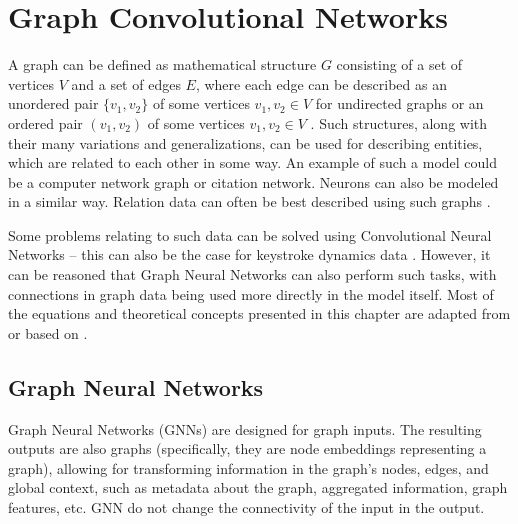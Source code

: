 
\chapter{Graph Convolutional Networks}

A graph can be defined as mathematical structure $G$ consisting of a set of vertices $V$ and a set of edges $E$, where each edge can be described as an unordered pair $\{ v_1, v_2 \}$ of some vertices $v_1, v_2 \in V$ for undirected graphs or an ordered pair $( v_1, v_2 )$ of some vertices $v_1, v_2 \in V$ \cite{wikipedia_graph_2025}. Such structures, along with their many variations and generalizations, can be used for describing entities, which are related to each other in some way. An example of such a model could be a computer network graph or citation network. Neurons can also be modeled in a similar way. Relation data can often be best described using such graphs \cite{Lesk2024}.

Some problems relating to such data can be solved using Convolutional Neural Networks -- this can also be the case for keystroke dynamics data \cite{Lu2020}\cite{Shar2023}. However, it can be reasoned that Graph Neural Networks can also perform such tasks, with connections in graph data being used more directly in the model itself. Most of the equations and theoretical concepts presented in this chapter are adapted from or based on \cite{Lesk2024}.

\section{Graph Neural Networks}
Graph Neural Networks (GNNs) are designed for graph inputs. The resulting outputs are also graphs (specifically, they are node embeddings representing a graph), allowing for transforming information in the graph's nodes, edges, and global context, such as metadata about the graph, aggregated information, graph features, etc. \cite{sanch2021} GNN do not change the connectivity of the input in the output. 


